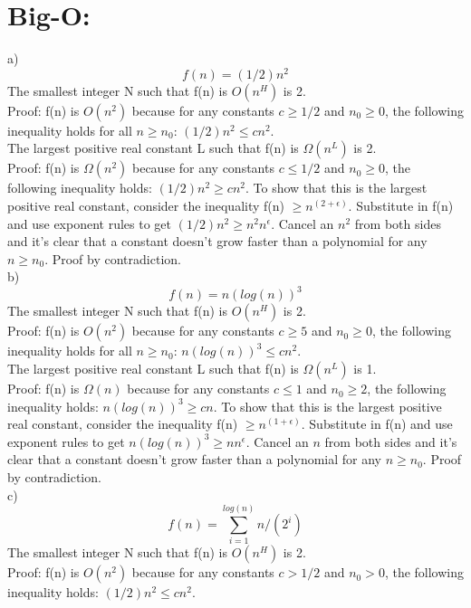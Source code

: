 \documentclass{article}
\begin{document}
\section{Big-O:}
a) \[f(n) = (1/2)n^2\] The smallest integer N such that f(n) is $O(n^H)$ is 2.\\ Proof: f(n) is $O(n^2)$ because for any constants $c \geq 1/2$ and $n_0 \geq 0$, the following inequality holds for all $n \geq n_0$: $(1/2)n^2 \leq cn^2$.\\

The largest positive real constant L such that f(n) is $\Omega(n^L)$ is 2.\\ Proof: f(n) is $\Omega(n^2)$ because for any constants $c \leq 1/2$ and $n_0 \geq 0$, the following inequality holds: $(1/2)n^2 \geq cn^2$. To show that this is the largest positive real constant, consider the inequality f(n) $\geq n^{(2 + \epsilon)}$. Substitute in f(n) and use exponent rules to get $(1/2)n^2 \geq n^2n^{\epsilon}$. Cancel an $n^2$ from both sides and it's clear that a constant doesn't grow faster than a polynomial for any $n \geq n_0$. Proof by contradiction.\\

b) \[f(n) = n(log(n))^3\] The smallest integer N such that f(n) is $O(n^H)$ is 2.\\ Proof: f(n) is $O(n^2)$ because for any constants $c \geq 5$ and $n_0 \geq 0$, the following inequality holds for all $n \geq n_0$: $n(log(n))^3 \leq cn^2$.\\

The largest positive real constant L such that f(n) is $\Omega(n^L)$ is 1.\\ Proof: f(n) is $\Omega(n)$ because for any constants $c \leq 1$ and $n_0 \geq 2$, the following inequality holds: $n(log(n))^3 \geq cn$. To show that this is the largest positive real constant, consider the inequality f(n) $\geq n^{(1 + \epsilon)}$. Substitute in f(n) and use exponent rules to get $n(log(n))^3 \geq nn^{\epsilon}$. Cancel an $n$ from both sides and it's clear that a constant doesn't grow faster than a polynomial for any $n \geq n_0$. Proof by contradiction.\\

c) \[f(n) = \sum_{i=1}^{log(n)} n/(2^i)\] The smallest integer N such that f(n) is $O(n^H)$ is 2.\\ Proof: f(n) is $O(n^2)$ because for any constants $c > 1/2$ and $n_0 > 0$, the following inequality holds: $(1/2)n^2 \leq cn^2$.\\
\end{document}
